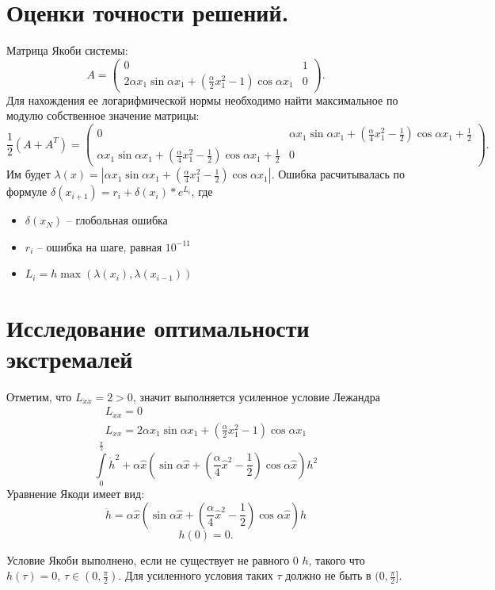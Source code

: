 \documentclass{article}
\begin{document}
\section{Оценки точности решений.}
Матрица Якоби системы:
$$A = \begin{pmatrix}
0 & 1  \\
  2\alpha x_{1} \sin \alpha x_{1} + (\frac\alpha 2 x^{2}_{1}-1)\cos \alpha x_{1}  & 0
\end{pmatrix}.$$
Для нахождения ее логарифмической нормы необходимо найти максимальное по модулю собственное значение матрицы:
$$\frac 1 2 (A + A^{T}) = \begin{pmatrix}
0 & \alpha x_{1} \sin \alpha x_{1} + (\frac\alpha 4 x^{2}_{1}-\frac 1 2)\cos \alpha x_{1} + \frac 1 2 \\
  \alpha x_{1} \sin \alpha x_{1} + (\frac\alpha 4 x^{2}_{1}-\frac 1 2)\cos \alpha x_{1} + \frac 1 2  & 0
\end{pmatrix}.$$
Им будет $\lambda(x) = |\alpha x_{1} \sin \alpha x_{1} + (\frac\alpha 4 x^{2}_{1}-\frac 1 2)\cos \alpha x_{1}|$.
Ошибка расчитывалась по формуле $\delta(x_{i+1}) = r_{i} + \delta(x_{i})*e^{L_{i}}$, где
\begin{itemize}
  \item $\delta(x_{N})$ -- глобольная ошибка
  \item $r_{i}$ -- ошибка на шаге, равная $10^{-11}$
  \item $L_{i} = h\max(\lambda(x_{i}), \lambda(x_{i-1}))$
\end{itemize}
\section{Исследование оптимальности экстремалей}
Отметим, что $L_{\dot{x}\dot{x}} = 2 > 0$, значит выполняется усиленное условие Лежандра
\begin{gather*}
L_{\dot{x}x} = 0 \\
L_{xx} =2\alpha x_{1} \sin \alpha x_{1} + (\frac\alpha 2 x^{2}_{1}-1)\cos \alpha x_{1}
\end{gather*}
\[\int\limits_{0}^{\frac \pi 2} \dot{h}^{2} + \alpha \hat{x} (\sin \alpha \hat{x} + (\frac\alpha 4 \hat{x}^{2}-\frac 1 2)\cos \alpha \hat x)h^{2}\]
Уравнение Якоди имеет вид:
        \[\ddot{h} = \alpha \hat{x} (\sin \alpha \hat{x} + (\frac\alpha 4 \hat{x}^{2}-\frac 1 2)\cos \alpha \hat x)h\]
        \[h(0) = 0.\]

Условие Якоби выполнено, если не существует не равного $0$ $h$, такого что $h(\tau) = 0$, $\tau \in (0, \frac \pi 2)$.
Для усиленного условия таких $\tau$ должно не быть в $(0, \frac \pi 2]$.
\end{document}
